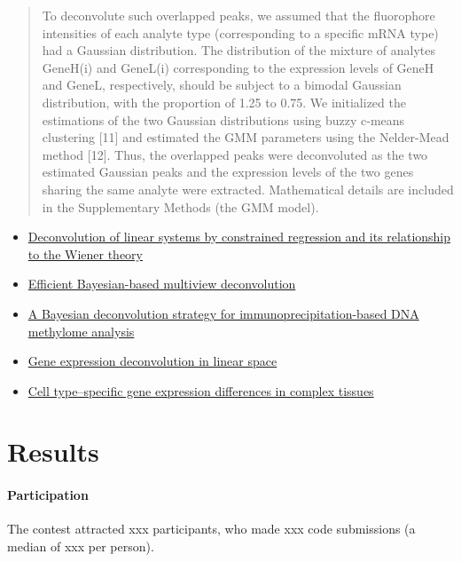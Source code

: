 \documentclass[]{article}
\let\oldparagraph\paragraph
\renewcommand{\paragraph}[1]{\oldparagraph{#1}\mbox{}}
\begin{document}
\begin{quote}
To deconvolute such overlapped peaks, we assumed that the fluorophore
intensities of each analyte type (corresponding to a specific mRNA type)
had a Gaussian distribution. The distribution of the mixture of analytes
GeneH(i) and GeneL(i) corresponding to the expression levels of GeneH
and GeneL, respectively, should be subject to a bimodal Gaussian
distribution, with the proportion of 1.25 to 0.75. We initialized the
estimations of the two Gaussian distributions using buzzy c-means
clustering {[}11{]} and estimated the GMM parameters using the
Nelder-Mead method {[}12{]}. Thus, the overlapped peaks were
deconvoluted as the two estimated Gaussian peaks and the expression
levels of the two genes sharing the same analyte were extracted.
Mathematical details are included in the Supplementary Methods (the GMM
model).
\end{quote}

\begin{itemize}
\item
  \href{https://ieeexplore.ieee.org/abstract/document/4044778}{Deconvolution
  of linear systems by constrained regression and its relationship to
  the Wiener theory}
\item
  \href{https://www.nature.com/articles/nmeth.2929}{Efficient
  Bayesian-based multiview deconvolution}
\item
  \href{https://www.nature.com/articles/nbt1414}{A Bayesian
  deconvolution strategy for immunoprecipitation-based DNA methylome
  analysis}
\item
  \href{https://www.nature.com/articles/nmeth.1830}{Gene expression
  deconvolution in linear space}
\item
  \href{https://www.nature.com/articles/nmeth.1439}{Cell type--specific
  gene expression differences in complex tissues}
\end{itemize}

\hypertarget{results}{%
\section{Results}\label{results}}

\hypertarget{participation}{%
\paragraph{Participation}\label{participation}}

The contest attracted xxx participants, who made xxx code submissions (a
median of xxx per person).
\end{document}
